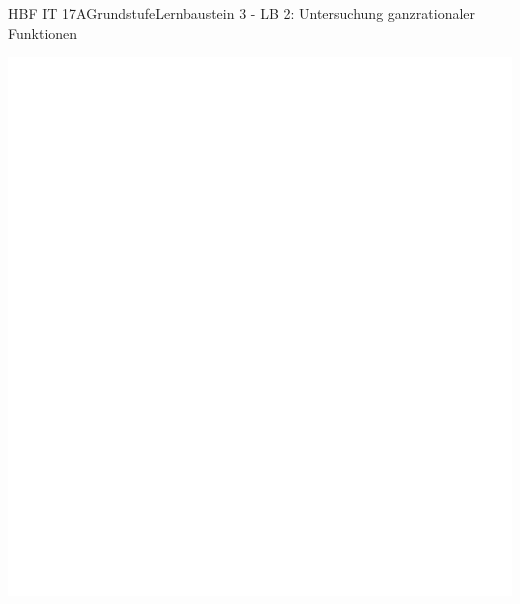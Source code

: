 \documentclass[oneside,openany,headings=optiontotoc,11pt,numbers=noenddot]{scrreprt}
\begin{document}
\begin{worksheet}{HBF IT 17A}{Grundstufe}{Lernbaustein 3 - LB 2: Untersuchung ganzrationaler Funktionen}
\begin{framed}
		\end{framed}
		\begin{framed}
			\includegraphics[scale=0.5]{../empty.jpg}
		\end{framed}
	\end{worksheet}
\end{document}

